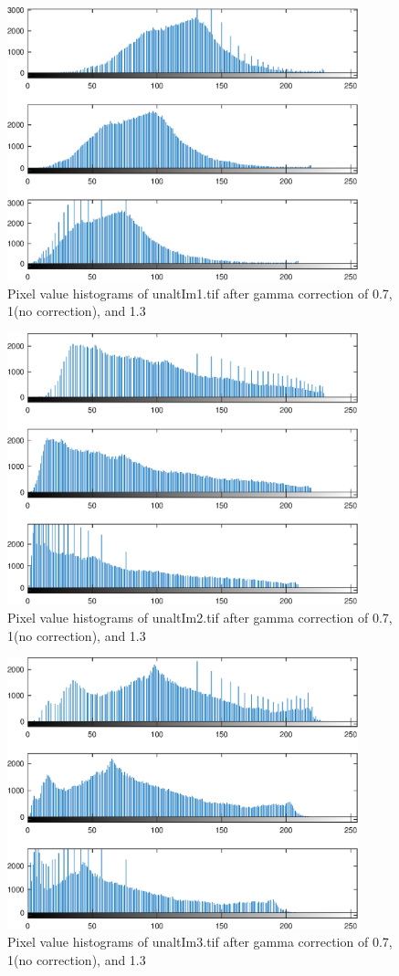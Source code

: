 \documentclass{article}
\begin{document}
\begin{figure}[H]
\centering
\includegraphics [width=4in]{lab6_03.eps}
\caption{Pixel value histograms of unaltIm1.tif after gamma correction
of 0.7, 1(no correction), and 1.3}
\end{figure}

\begin{figure}[H]
\centering
\includegraphics [width=4in]{lab6_04.eps}
\caption{Pixel value histograms of unaltIm2.tif after gamma correction
of 0.7, 1(no correction), and 1.3}
\end{figure}

\begin{figure}[H]
\centering
\includegraphics [width=4in]{lab6_05.eps}
\caption{Pixel value histograms of unaltIm3.tif after gamma correction
of 0.7, 1(no correction), and 1.3}
\end{figure}
\end{document}
